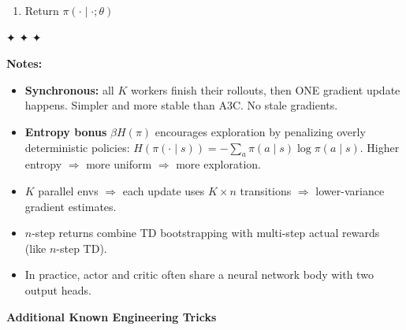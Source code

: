 \documentclass[11pt]{article}
\providecommand{\tightlist}{%
      \setlength{\itemsep}{0pt}\setlength{\parskip}{0pt}}
\begin{document}
\begin{enumerate}
  \[\mathcal{L}_\text{critic}(w) = \frac{1}{K}\sum_k\sum_i \bigl(R - V(s_i^k;w)\bigr)^2\]

  \begin{itemize}
  \tightlist
  \item
    \textbf{--- Single synchronous gradient update ---}
  \end{itemize}

  \[\theta \leftarrow \theta - \alpha_\theta\,\nabla_\theta\,\mathcal{L}_\text{actor}, \qquad w \leftarrow w - \alpha_w\,\nabla_w\,\mathcal{L}_\text{critic}\]
\item
  Return \(\pi(\cdot \mid \cdot;\theta)\)
\end{enumerate}

✦ ✦ ✦

\textbf{Notes:}

\begin{itemize}
\tightlist
\item
  \textbf{Synchronous:} all \(K\) workers finish their rollouts, then
  ONE gradient update happens. Simpler and more stable than A3C. No
  stale gradients.
\item
  \textbf{Entropy bonus} \(\beta H(\pi)\) encourages exploration by
  penalizing overly deterministic policies:
  \(H(\pi(\cdot \mid s)) = -\sum_a \pi(a \mid s)\log\pi(a \mid s)\).
  Higher entropy \(\Rightarrow\) more uniform \(\Rightarrow\) more
  exploration.
\item
  \(K\) parallel envs \(\Rightarrow\) each update uses \(K \times n\)
  transitions \(\Rightarrow\) lower-variance gradient estimates.
\item
  \(n\)-step returns combine TD bootstrapping with multi-step actual
  rewards (like \(n\)-step TD).
\item
  In practice, actor and critic often share a neural network body with
  two output heads.
\end{itemize}

    \label{tricks-4-3}

    \textbf{Additional Known Engineering Tricks}
\end{document}
